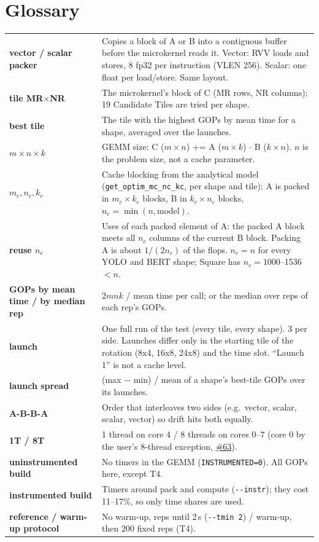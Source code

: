 \documentclass[10pt,a4paper]{article}
\newcommand{\iss}[1]{\href{https://github.com/JieGH/RVV_code_gen_via_MLIR_xDSL/issues/#1}{\##1}}
\begin{document}
\section*{Glossary}
\small
\begin{tabularx}{\textwidth}{@{}>{\bfseries}p{3.3cm}X@{}}
\toprule
vector / scalar packer & Copies a block of A or B into a contiguous buffer before the microkernel reads it.
  Vector: RVV loads and stores, 8 fp32 per instruction (VLEN 256). Scalar: one float per load/store. Same layout. \\
tile MR$\times$NR & The microkernel's block of C (MR rows, NR columns); 19 Candidate Tiles are tried per shape. \\
best tile & The tile with the highest GOPs by mean time for a shape, averaged over the launches. \\
$m\times n\times k$ & GEMM size: C ($m\times n$) += A ($m\times k$) $\cdot$ B ($k\times n$). $n$ is the problem size, not a cache parameter. \\
$m_c, n_c, k_c$ & Cache blocking from the analytical model (\texttt{get\_optim\_mc\_nc\_kc}, per shape and tile): A is
  packed in $m_c\times k_c$ blocks, B in $k_c\times n_c$ blocks, $n_c=\min(n, \mathrm{model})$. \\
reuse $n_c$ & Uses of each packed element of A: the packed A block meets all $n_c$ columns of the current B block. Packing A
  is about $1/(2n_c)$ of the flops. $n_c=n$ for every YOLO and BERT shape; Square has $n_c=1000$--1536 $<n$. \\
GOPs by mean time / by median rep & $2mnk$ / mean time per call; or the median over reps of each rep's GOPs. \\
launch & One full run of the test (every tile, every shape). 3 per side. Launches differ only in the starting tile
  of the rotation (8x4, 16x8, 24x8) and the time slot. ``Launch 1'' is not a cache level. \\
launch spread & (max $-$ min) / mean of a shape's best-tile GOPs over its launches. \\
A-B-B-A & Order that interleaves two sides (e.g.\ vector, scalar, scalar, vector) so drift hits both equally. \\
1T / 8T & 1 thread on core 4 / 8 threads on cores 0--7 (core 0 by the user's 8-thread exception, \iss{63}). \\
uninstrumented build & No timers in the GEMM (\texttt{INSTRUMENTED=0}). All GOPs here, except T4. \\
instrumented build & Timers around pack and compute (\texttt{-{}-instr}); they cost 11--17\%, so only time shares are used. \\
reference / warm-up protocol & No warm-up, reps until 2\,s (\texttt{-{}-tmin 2}) / warm-up, then 200 fixed reps (T4). \\
\bottomrule
\end{tabularx}
\normalsize
\end{document}
